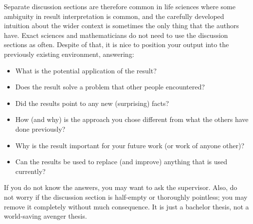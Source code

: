 Separate discussion sections are therefore common in life sciences where some ambiguity in result interpretation is common, and the carefully developed intuition about the wider context is sometimes the only thing that the authors have. Exact sciences and mathematicians do not need to use the discussion sections as often. Despite of that, it is nice to position your output into the previously existing environment, answering:
\begin{itemize}
\item What is the potential application of the result?
\item Does the result solve a problem that other people encountered?
\item Did the results point to any new (surprising) facts?
\item How (and why) is the approach you chose different from what the others have done previously?
\item Why is the result important for your future work (or work of anyone other)?
\item Can the results be used to replace (and improve) anything that is used currently?
\end{itemize}

If you do not know the answers, you may want to ask the supervisor. Also, do not worry if the discussion section is half-empty or thoroughly pointless; you may remove it completely without much consequence. It is just a bachelor thesis, not a world-saving avenger thesis.
